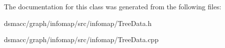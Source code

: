 The documentation for this class was generated from the following files\+:\begin{DoxyCompactItemize}
\item 
dsmacc/graph/infomap/src/infomap/Tree\+Data.\+h\item 
dsmacc/graph/infomap/src/infomap/Tree\+Data.\+cpp\end{DoxyCompactItemize}
